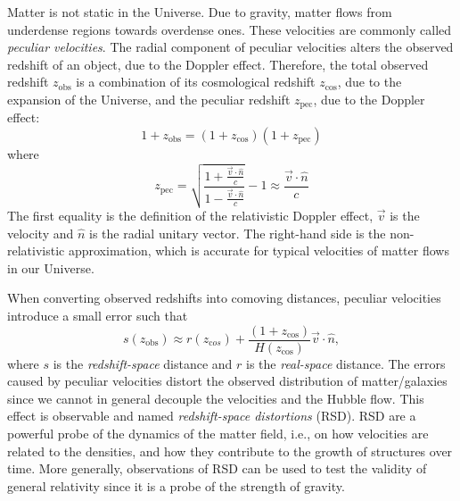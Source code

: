     Matter is not static in the Universe. 
    Due to gravity, matter flows from underdense regions towards overdense ones. 
    These velocities are commonly called \emph{peculiar velocities}.
    The radial component of peculiar velocities alters the observed redshift 
    of an object, due to the Doppler effect. 
    Therefore, the total observed redshift $z_\mathrm{obs}$
    is a combination of its cosmological redshift $z_\mathrm{cos}$, 
    due to the expansion of the Universe,
    and the peculiar redshift $z_\mathrm{pec}$, due to the Doppler effect:
    \begin{equation}
        1 + z_\mathrm{obs} = (1 + z_\mathrm{cos})(1 + z_\mathrm{pec})
        \label{eq:observed_redshift}
    \end{equation}
    where
    \begin{equation}
        z_\mathrm{pec} = \sqrt{\frac{1 + \frac{\vec{v}\cdot \hat{n}}{c} }{1 - \frac{\vec{v}\cdot \hat{n}}{c}}} - 1
                        \approx \frac{\vec{v}\cdot \hat{n}}{c}
        \label{eq:peculiar_redshift}
    \end{equation}
    The first equality is the definition of the relativistic Doppler effect, 
    $\vec{v}$ is the velocity and $\hat{n}$ is the radial unitary vector.  
    The right-hand side is the non-relativistic approximation, which is accurate
    for typical velocities of matter flows in our Universe.

    When converting observed redshifts into comoving distances, peculiar velocities
    introduce a small error such that 
    \begin{equation}
        s(z_\mathrm{obs}) \approx r(z_{\mathrm cos}) + \frac{(1+z_\mathrm{cos})}{H(z_\mathrm{cos})}\vec{v} \cdot \hat{n},
        \label{eq:redshift_space_distance}
    \end{equation}
    where $s$ is the \emph{redshift-space} distance and $r$ is the \emph{real-space} distance.
    The errors caused by peculiar velocities distort the observed distribution of matter/galaxies
    since we cannot in general decouple the velocities and the Hubble flow. 
    This effect is observable and named \emph{redshift-space distortions} (RSD). 
    RSD are a powerful probe of the dynamics of the matter field, i.e., 
    on how velocities are related to the densities, and how they contribute
    to the growth of structures over time. More generally, 
    observations of RSD can be used to test the validity of general 
    relativity since it is a probe of the strength of gravity. 

